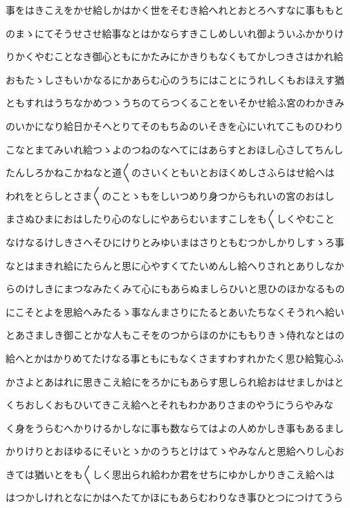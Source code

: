 \documentclass[a4paper,11pt,landscape]{ltjtarticle}
\begin{document}
事をはきこえをかせ給しかはかく世をそむき給へれとおとろへすなに事ももと
\par\medskip
のまゝにてそうせさせ給事なとはかならすきこしめしいれ御よういふかかりけ
\par\medskip
りかくやむことなき御心ともにかたみにかきりもなくもてかしつきさはかれ給
\par\medskip
おもたゝしさもいかなるにかあらむ心のうちにはことにうれしくもおほえす猶
\par\medskip
ともすれはうちなかめつゝうちのてらつくることをいそかせ給ふ宮のわかきみ
\par\medskip
のいかになり給日かそへとりてそのもちゐのいそきを心にいれてこものひわり
\par\medskip
こなとまてみいれ給つゝよのつねのなへてにはあらすとおほし心さしてちんし
\par\medskip
たんしろかねこかねなと道〱のさいくともいとおほくめしさふらはせ給へは
\par\medskip
われをとらしとさま〱のことゝもをしいつめり身つからもれいの宮のおはし
\par\medskip
まさぬひまにおはしたり心のなしにやあらむいますこしをも〱しくやむこと
\par\medskip
なけなるけしきさへそひにけりとみゆいまはさりともむつかしかりしすゝろ事
\par\medskip
なとはまきれ給にたらんと思に心やすくてたいめんし給へりされとありしなか
\par\medskip
らのけしきにまつなみたくみて心にもあらぬましらひいと思ひのほかなるもの
\par\medskip
にこそとよを思給へみたるゝ事なんまさりにたるとあいたちなくそうれへ給い
\par\medskip
とあさましき御ことかな人もこそをのつからほのかにももりきゝ侍れなとはの
\par\medskip
給へとかはかりめてたけなる事ともにもなくさますわすれかたく思ひ給覧心ふ
\par\medskip
かさよとあはれに思きこえ給にをろかにもあらす思しられ給おはせましかはと
\par\medskip
くちおしくおもひいてきこえ給へとそれもわかありさまのやうにうらやみな
\par\medskip
く身をうらむへかりけるかしなに事も数ならてはよの人めかしき事もあるまし
\par\medskip
かりけりとおほゆるにそいとゝかのうちとけはてゝやみなんと思給へりし心お
\par\medskip
きては猶いとをも〱しく思出られ給わか君をせちにゆかしかりきこえ給へは
\par\medskip
はつかしけれとなにかはへたてかほにもあらむわりなき事ひとつにつけてうら
\end{document}
